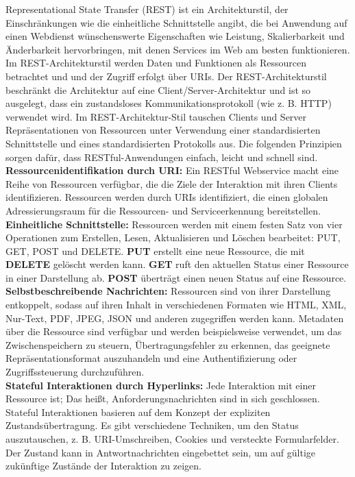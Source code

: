 Representational State Transfer (REST) ist ein Architekturstil, der Einschränkungen wie die einheitliche Schnittstelle angibt, die bei Anwendung auf einen Webdienst wünschenswerte Eigenschaften wie Leistung, Skalierbarkeit und Änderbarkeit hervorbringen, mit denen Services im Web am besten funktionieren. Im REST-Architekturstil werden Daten und Funktionen als Ressourcen betrachtet und und der Zugriff erfolgt über URIs. Der REST-Architekturstil beschränkt die Architektur auf eine Client/Server-Architektur und ist so ausgelegt, dass ein zustandsloses Kommunikationsprotokoll (wie z. B. HTTP) verwendet wird. Im REST-Architektur-Stil tauschen Clients und Server Repräsentationen von Ressourcen unter Verwendung einer standardisierten Schnittstelle und eines standardisierten Protokolls aus. Die folgenden Prinzipien sorgen dafür, dass RESTful-Anwendungen einfach, leicht und schnell sind\cite{rws13od}.\\

\textbf{Ressourcenidentifikation durch URI:} Ein RESTful Webservice macht eine Reihe von Ressourcen verfügbar, die die Ziele der Interaktion mit ihren Clients identifizieren. Ressourcen werden durch URIs identifiziert, die einen globalen Adressierungsraum für die Ressourcen- und Serviceerkennung bereitstellen.\\

\textbf{Einheitliche Schnittstelle:} Ressourcen werden mit einem festen Satz von vier Operationen zum Erstellen, Lesen, Aktualisieren und Löschen bearbeitet: PUT, GET, POST und DELETE. \textbf{PUT} erstellt eine neue Ressource, die mit \textbf{DELETE} gelöscht werden kann. \textbf{GET} ruft den aktuellen Status einer Ressource in einer Darstellung ab. \textbf{POST} überträgt einen neuen Status auf eine Ressource.\\

\textbf{Selbstbeschreibende Nachrichten:} Ressourcen sind von ihrer Darstellung entkoppelt, sodass auf ihren Inhalt in verschiedenen Formaten wie HTML, XML, Nur-Text, PDF, JPEG, JSON und anderen zugegriffen werden kann. Metadaten über die Ressource sind verfügbar und werden beispielsweise verwendet, um das Zwischenspeichern zu steuern, Übertragungsfehler zu erkennen, das geeignete Repräsentationsformat auszuhandeln und eine Authentifizierung oder Zugriffssteuerung durchzuführen.\\

\textbf{Stateful Interaktionen durch Hyperlinks:} Jede Interaktion mit einer Ressource ist; Das heißt, Anforderungsnachrichten sind in sich geschlossen. Stateful Interaktionen basieren auf dem Konzept der expliziten Zustandsübertragung. Es gibt verschiedene Techniken, um den Status auszutauschen, z. B. URI-Umschreiben, Cookies und versteckte Formularfelder. Der Zustand kann in Antwortnachrichten eingebettet sein, um auf gültige zukünftige Zustände der Interaktion zu zeigen.

